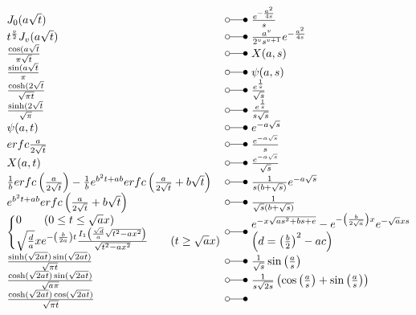 \[ \begin{array}{@{}l@{ ~ \laplace ~ }l@{}}
J_0(a \sqrt{t}) &
    \frac{e^{-\frac{a^2}{4s}}}{s} \\
t^{\frac{v}{2}} J_v(a\sqrt{t}) &
    \frac{a^v}{2^v s^{v + 1}} e^{-\frac{a^2}{4s}} \\
\frac{\cos(a\sqrt{t}}{\pi \sqrt{t}} &
    X(a, s) \\
\frac{\sin(a \sqrt{t}}{\pi} &
    \psi(a, s) \\
\frac{\cosh(2 \sqrt{t}}{\sqrt{\pi t}} &
    \frac{e^{\frac{1}{s}}}{\sqrt{s}} \\
\frac{\sinh(2 \sqrt{t}}{\sqrt{\pi}} &
    \frac{e^{\frac{1}{s}}}{s \sqrt{s}} \\
\psi(a, t) &
    e^{- a \sqrt{s}} \\
erfc \frac{a}{2 \sqrt{t}} &
    \frac{e^{- a \sqrt{s}}}{s} \\
X(a, t) &
    \frac{e^{- a \sqrt{s}}}{\sqrt{s}} \\
\frac{1}{b} erfc\left(\frac{a}{2 \sqrt{t}}\right) - \frac{1}{b} e^{b^2 t + ab} erfc\left(\frac{a}{2 \sqrt{t}} + b \sqrt{t}\right) &
    \frac{1}{s (b + \sqrt{s})} e^{-a \sqrt{s}} \\
e^{b^2 t + ab} erfc\left(\frac{a}{2 \sqrt{t}} + b \sqrt{t}\right) &
    \frac{1}{\sqrt{s} (b + \sqrt{s})} \\
\left\lbrace\begin{array}{@{}l@{}}
0 \qquad (0 \leq t \leq \sqrt{a}x) \\
\sqrt{\frac{d}{a}} x e^{-\left(\frac{b}{2a}\right)t} \frac{I_1\left(\frac{\sqrt{d}}{a} \sqrt{t^2 - a x^2}\right)}{\sqrt{t^2 - a x^2}} \qquad (t \geq \sqrt{a}x) \\
\end{array}\right. &
    \begin{array}{@{}l@{}}
    e^{-x \sqrt{a s^2 + bs + e}} - e^{-\left(\frac{b}{2 \sqrt{a}}\right)x} e^{-\sqrt{a}xs} \\
    \left(d = \left(\frac{b}{2}\right)^2 - ac\right)
    \end{array} \\
\frac{\sinh(\sqrt{2 at}) \sin(\sqrt{2 at})}{\sqrt{\pi t}} &
    \frac{1}{\sqrt{s}} \sin\left(\frac{a}{s}\right) \\
\frac{\cosh(\sqrt{2 at}) \sin(\sqrt{2 at})}{\sqrt{a \pi}} &
    \frac{1}{s \sqrt{2 s}} \left(\cos\left(\frac{a}{s}\right) + \sin\left(\frac{a}{s}\right)\right) \\
\frac{\cosh(\sqrt{2 at}) \cos(\sqrt{2 at})}{\sqrt{\pi t}} &

\end{array}\]
